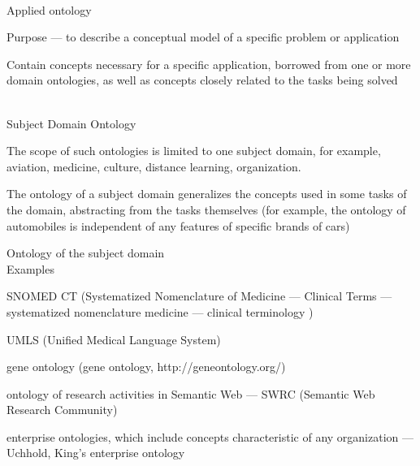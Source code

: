 \begin{frame}{\\Applied ontology}
	\topline
	\justifying
	
	\vspace{10mm}
	
	\begin{textitemize}
		\item Purpose --- to describe a conceptual model of a specific problem or application
		\item Contain concepts necessary for a specific application, borrowed from one or more domain ontologies, as well as concepts closely related to the tasks being solved
	\end{textitemize}
	
\end{frame}

\begin{frame}{\\Subject Domain Ontology}
	\topline
	\justifying
	
	\vspace{10mm}
	
	\begin{textitemize}
		\item The scope of such ontologies is limited to one subject domain, for example, aviation, medicine, culture, distance learning, organization.
		\item The ontology of a subject domain generalizes the concepts used in some tasks of the domain, abstracting from the tasks themselves (for example, the ontology of automobiles is independent of any features of specific brands of cars)
	\end{textitemize}
	
\end{frame}

\begin{frame}{Ontology of the subject domain\\Examples}
	\topline
	\justifying
	
	\vspace{10mm}
	\begin{textitemize}
		\item SNOMED CT (Systematized Nomenclature of Medicine --- Clinical Terms --- systematized nomenclature medicine --- clinical terminology )
		\item UMLS (Unified Medical Language System)
		\item gene ontology (gene ontology, http://geneontology.org/)
		\item ontology of research activities in Semantic Web --- SWRC (Semantic Web Research Community)
		\item enterprise ontologies, which include concepts characteristic of any organization --- Uchhold, King's enterprise ontology
	\end{textitemize}
	
\end{frame}

